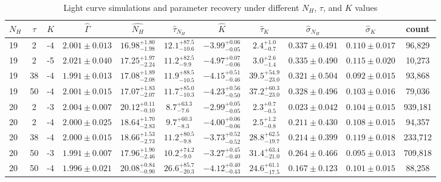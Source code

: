 \documentclass{aa}
\begin{document}
\begin{table}
        \caption{Light curve simulations and parameter recovery under different $N_H$, $\tau$, and $K$ values}
        \label{tab:light_curve_sim_table}
        \centering
        \begin{tabular}{lcccccccccc}   %
        \hline\hline
        $N_H$ & $\tau$ & $K$ & $\hat\Gamma$ & $\hat{N_H}$ & $\hat\tau_{N_H}$ & $\hat K$ & $\hat\tau_K$ & $\hat\sigma_{N_H}$ & $\hat\sigma_K$ & count \\
        \hline
        19 & 2 & -4 & $2.001 \pm 0.013$ & $16.98^{+1.80}_{-1.98}$ & $12.1^{+87.5}_{-10.6}$ & $-3.99^{+0.06}_{-0.05}$ & $2.4^{+1.0}_{-0.7}$ & $0.337 \pm 0.491$ & $0.110 \pm 0.017$ & 96,829 \\
        19 & 2 & -5 & $2.021 \pm 0.040$ & $17.25^{+1.97}_{-2.24}$ & $11.2^{+82.5}_{-9.9}$ & $-4.97^{+0.07}_{-0.06}$ & $3.0^{+2.6}_{-1.4}$ & $0.335 \pm 0.490$ & $0.115 \pm 0.020$ & 10,273 \\
        19 & 38 & -4 & $1.991 \pm 0.013$ & $17.08^{+1.89}_{-2.08}$ & $11.9^{+88.5}_{-10.5}$ & $-4.15^{+0.51}_{-0.46}$ & $39.5^{+54.9}_{-23.0}$ & $0.321 \pm 0.504$ & $0.092 \pm 0.015$ & 93,868 \\
        19 & 50 & -4 & $2.001 \pm 0.015$ & $17.07^{+1.83}_{-2.07}$ & $11.7^{+85.0}_{-10.3}$ & $-4.23^{+0.56}_{-0.50}$ & $37.2^{+60.3}_{-23.0}$ & $0.328 \pm 0.496$ & $0.103 \pm 0.016$ & 79,036 \\
        20 & 2 & -3 & $2.004 \pm 0.007$ & $20.12^{+0.11}_{-0.10}$ & $8.7^{+63.3}_{-7.6}$ & $-2.99^{+0.05}_{-0.05}$ & $2.3^{+0.7}_{-0.5}$ & $0.023 \pm 0.042$ & $0.104 \pm 0.015$ & 939,181 \\
        20 & 2 & -4 & $2.000 \pm 0.025$ & $18.64^{+1.70}_{-2.83}$ & $9.7^{+60.3}_{-8.3}$ & $-4.00^{+0.06}_{-0.06}$ & $2.5^{+1.2}_{-0.8}$ & $0.211 \pm 0.430$ & $0.108 \pm 0.015$ & 94,357 \\
        20 & 38 & -4 & $2.000 \pm 0.015$ & $18.66^{+1.53}_{-2.73}$ & $11.2^{+80.5}_{-9.8}$ & $-3.73^{+0.52}_{-0.52}$ & $28.8^{+62.5}_{-19.7}$ & $0.214 \pm 0.399$ & $0.119 \pm 0.018$ & 233,712 \\
        20 & 50 & -3 & $1.991 \pm 0.007$ & $17.96^{+1.90}_{-2.46}$ & $10.2^{+74.2}_{-9.0}$ & $-3.27^{+0.45}_{-0.40}$ & $31.4^{+63.4}_{-21.0}$ & $0.264 \pm 0.466$ & $0.095 \pm 0.013$ & 709,818 \\
        20 & 50 & -4 & $1.996 \pm 0.021$ & $20.08^{+0.84}_{-0.90}$ & $26.6^{+85.7}_{-20.3}$ & $-4.12^{+0.40}_{-0.43}$ & $24.6^{+61.1}_{-17.5}$ & $0.167 \pm 0.123$ & $0.101 \pm 0.015$ & 88,258 \\

\end{tabular}
\end{table}
\end{document}
